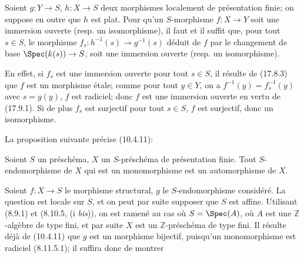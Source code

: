 \begin{corollary}[17.9.5]
\label{IV.17.9.5}
Soient $g:Y\to S$, $h:X\to S$ deux morphismes localement de présentation finie; on suppose en outre que $h$ est plat. Pour qu'un $S$-morphisme $f:X\to Y$ soit une immersion ouverte (resp. un isomorphisme), il faut et il suffit que, pour tout $s\in S$, le morphisme $f_s:h^{-1}(s)\to g^{-1}(s)$ déduit de $f$ par le changement de base $\Spec(k(s))\to S$, soit une immersion ouverte (resp. un isomorphisme).
\end{corollary}

En effet, si $f_s$ est une immersion ouverte pour tout $s\in S$, il résulte de (17.8.3) que $f$ est un morphisme étale; comme pour tout $y\in Y$, on a $f^{-1}(y)=f_s^{-1}(y)$ avec $s=g(y)$, $f$ est radiciel; donc $f$ est une immersion ouverte en vertu de (17.9.1). Si de plus $f_s$ est surjectif pour tout $s\in S$, $f$ est surjectif, donc un isomorphisme.

La proposition suivante précise (10.4.11):

\begin{proposition}[17.9.6]
Soient $S$ un préschéma, $X$ un $S$-préschéma de présentation finie. Tout $S$-endomorphisme de $X$ qui est un monomorphisme est un automorphisme de $X$.
\end{proposition}

Soient $f:X\to S$ le morphisme structural, $g$ le $S$-endomorphisme considéré. La question est locale sur $S$, et on peut par suite supposer que $S$ est affine. Utilisant (8.9.1) et (8.10.5, (i \emph{bis})), on est ramené au cas où $S=\Spec(A)$, où $A$ est une $\mathbb{Z}$-algèbre de type fini, et par suite $X$ est un $\mathbb{Z}$-préschéma de type fini. Il résulte déjà de (10.4.11) que $g$ est un morphisme bijectif, puisqu'un monomorphisme est radiciel (8.11.5.1); il suffira donc de montrer

